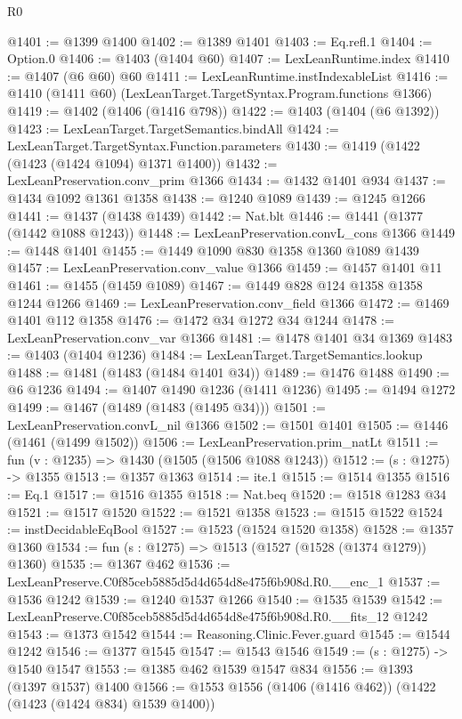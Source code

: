 \begin{lexlean}{R0}
\begin{coremodule}
@1401 := @1399 @1400
@1402 := @1389 @1401
@1403 := Eq.refl.{1}
@1404 := Option.{0}
@1406 := @1403 (@1404 @60)
@1407 := LexLeanRuntime.index
@1410 := @1407 (@6 @60) @60
@1411 := LexLeanRuntime.instIndexableList
@1416 := @1410 (@1411 @60) (LexLeanTarget.TargetSyntax.Program.functions @1366)
@1419 := @1402 (@1406 (@1416 @798))
@1422 := @1403 (@1404 (@6 @1392))
@1423 := LexLeanTarget.TargetSemantics.bindAll
@1424 := LexLeanTarget.TargetSyntax.Function.parameters
@1430 := @1419 (@1422 (@1423 (@1424 @1094) @1371 @1400))
@1432 := LexLeanPreservation.conv_prim @1366
@1434 := @1432 @1401 @934
@1437 := @1434 @1092 @1361 @1358
@1438 := @1240 @1089
@1439 := @1245 @1266
@1441 := @1437 (@1438 @1439)
@1442 := Nat.blt
@1446 := @1441 (@1377 (@1442 @1088 @1243))
@1448 := LexLeanPreservation.convL_cons @1366
@1449 := @1448 @1401
@1455 := @1449 @1090 @830 @1358 @1360 @1089 @1439
@1457 := LexLeanPreservation.conv_value @1366
@1459 := @1457 @1401 @11
@1461 := @1455 (@1459 @1089)
@1467 := @1449 @828 @124 @1358 @1358 @1244 @1266
@1469 := LexLeanPreservation.conv_field @1366
@1472 := @1469 @1401 @112 @1358
@1476 := @1472 @34 @1272 @34 @1244
@1478 := LexLeanPreservation.conv_var @1366
@1481 := @1478 @1401 @34 @1369
@1483 := @1403 (@1404 @1236)
@1484 := LexLeanTarget.TargetSemantics.lookup
@1488 := @1481 (@1483 (@1484 @1401 @34))
@1489 := @1476 @1488
@1490 := @6 @1236
@1494 := @1407 @1490 @1236 (@1411 @1236)
@1495 := @1494 @1272
@1499 := @1467 (@1489 (@1483 (@1495 @34)))
@1501 := LexLeanPreservation.convL_nil @1366
@1502 := @1501 @1401
@1505 := @1446 (@1461 (@1499 @1502))
@1506 := LexLeanPreservation.prim_natLt
@1511 := fun (v : @1235) => @1430 (@1505 (@1506 @1088 @1243))
@1512 := (s : @1275) -> @1355
@1513 := @1357 @1363
@1514 := ite.{1}
@1515 := @1514 @1355
@1516 := Eq.{1}
@1517 := @1516 @1355
@1518 := Nat.beq
@1520 := @1518 @1283 @34
@1521 := @1517 @1520
@1522 := @1521 @1358
@1523 := @1515 @1522
@1524 := instDecidableEqBool
@1527 := @1523 (@1524 @1520 @1358)
@1528 := @1357 @1360
@1534 := fun (s : @1275) => @1513 (@1527 (@1528 (@1374 @1279)) @1360)
@1535 := @1367 @462
@1536 := LexLeanPreserve.C0f85ceb5885d5d4d654d8e475f6b908d.R0.__enc_1
@1537 := @1536 @1242
@1539 := @1240 @1537 @1266
@1540 := @1535 @1539
@1542 := LexLeanPreserve.C0f85ceb5885d5d4d654d8e475f6b908d.R0.__fits_12 @1242
@1543 := @1373 @1542
@1544 := Reasoning.Clinic.Fever.guard
@1545 := @1544 @1242
@1546 := @1377 @1545
@1547 := @1543 @1546
@1549 := (s : @1275) -> @1540 @1547
@1553 := @1385 @462 @1539 @1547 @834
@1556 := @1393 (@1397 @1537) @1400
@1566 := @1553 @1556 (@1406 (@1416 @462)) (@1422 (@1423 (@1424 @834) @1539 @1400))

\end{coremodule}
\end{lexlean}
